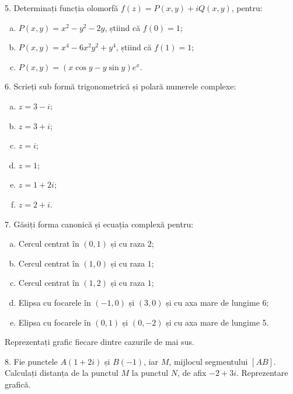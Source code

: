\vspace{0.3cm}

5. Determinați funcția olomorfă $ f(z) = P(x, y) + iQ(x, y) $, pentru:
\begin{enumerate}[(a)]
\item $ P(x, y) = x^2 - y^2 - 2y $, știind că $ f(0) = 1 $;
\item $ P(x, y) = x^4 - 6x^2y^2 + y^4 $, știind că $ f(1) = 1 $;
\item $ P(x, y) = (x \cos y - y \sin y)e^x $.
\end{enumerate}

\vspace{0.3cm}

6. Scrieți sub formă trigonometrică și polară numerele complexe:
\begin{enumerate}[(a)]
\item $ z = 3 - i $;
\item $ z = 3 + i $;
\item $ z = i $;
\item $ z = 1 $;
\item $ z = 1 + 2i $;
\item $ z = 2 + i $.
\end{enumerate}

\vspace{0.3cm}

7. Găsiți forma canonică și ecuația complexă pentru:
\begin{enumerate}[(a)]
\item Cercul centrat în $ (0, 1) $ și cu raza $ 2 $;
\item Cercul centrat în $ (1, 0) $ și cu raza $ 1 $;
\item Cercul centrat în $ (1, 2) $ și cu raza $ 1 $;
\item Elipsa cu focarele în $ (-1, 0) $ și $ (3, 0) $ și cu
  axa mare de lungime 6;
\item Elipsa cu focarele în $ (0, 1) $ și $ (0, -2) $ și
  cu axa mare de lungime 5.
\end{enumerate}

Reprezentați grafic fiecare dintre cazurile de mai sus.

\vspace{0.3cm}

8. Fie punctele $ A(1 + 2i) $ și $ B(-1) $, iar $ M $, mijlocul
segmentului $ [AB] $. Calculați distanța de la punctul $ M $
la punctul $ N $, de afix $ -2 + 3i $. Reprezentare grafică.


  


